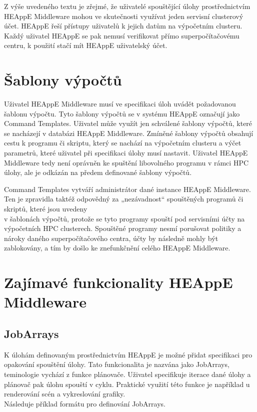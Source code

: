 Z výše uvedeného textu je zřejmé, že uživatelé spouštějící úlohy prostřednictvím HEAppE Middleware mohou ve skutečnosti využívat jeden servisní clusterový účet. HEAppE řeší přístupy uživatelů k jejich datům na výpočetním clusteru. Každý uživatel HEAppE se pak nemusí verifikovat přímo superpočítačovému centru, k použití stačí mít HEAppE uživatelský účet.

\section{Šablony výpočtů}
Uživatel HEAppE Middleware musí ve specifikaci úloh uvádět požadovanou šablonu výpočtu. Tyto šablony výpočtů se v systému HEAppE označují jako Command Templates. Uživatel může využít jen schválené šablony výpočtů, které se nacházejí v databázi HEAppE Middleware. Zmíněné šablony výpočtů obsahují cestu k programu či skriptu, který se nachází na výpočetním clusteru a výčet parametrů, které uživatel při specifikaci úlohy musí nastavit. Uživatel HEAppE Middleware tedy není oprávněn ke spuštění libovolného programu v rámci HPC úlohy, ale je odkázán na předem definované šablony výpočtů.

Command Templates vytváří administrátor dané instance HEAppE Middleware. Ten je zpravidla taktéž odpovědný za „nezávadnost“ spouštěných programů či skriptů, které jsou uvedeny \\v šablonách výpočtů, protože se tyto programy spouští pod servisními účty na výpočetních HPC clusterech. Spouštěné programy nesmí porušovat politiky a nároky daného superpočítačového centra, účty by následně mohly být zablokovány, a tím by došlo ke znefunkčnění celého HEAppE Middleware.

\section{Zajímavé funkcionality HEAppE Middleware}
\subsection{JobArrays}
K úlohám definovaným prostřednictvím HEAppE je možné přidat specifikaci pro opakování spouštění úlohy. Tato funkcionalita je nazvána jako JobArrays, teminologie vychází z funkce plánovače. Uživatel specifikuje iterace dané úlohy a plánovač pak úlohu spouští v cyklu. Praktické využití této funkce je například u renderování scén a vykreslování grafiky.
\\Následuje příklad formátu pro definování JobArrays.


